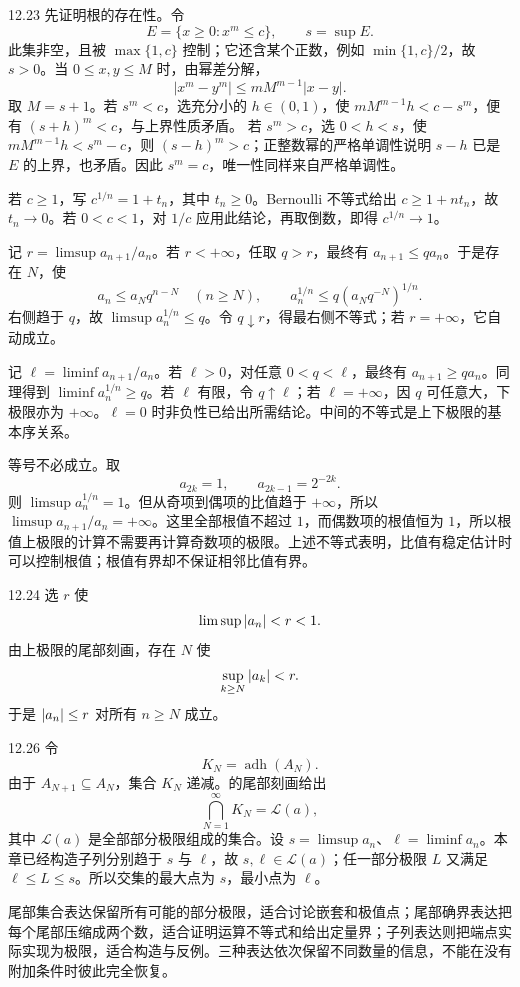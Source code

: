 \begin{solution}{12.23}
先证明根的存在性。令
\[
 E=\{x\ge0:x^m\le c\},\qquad s=\sup E.
\]
此集非空，且被 \(\max\{1,c\}\) 控制；它还含某个正数，例如 \(\min\{1,c\}/2\)，故 \(s>0\)。当 \(0\le x,y\le M\) 时，由幂差分解，
\[
 |x^m-y^m|\le mM^{m-1}|x-y|.
\]
取 \(M=s+1\)。若 \(s^m<c\)，选充分小的 \(h\in(0,1)\)，使
\(mM^{m-1}h<c-s^m\)，便有 \((s+h)^m<c\)，与上界性质矛盾。
若 \(s^m>c\)，选 \(0<h<s\)，使 \(mM^{m-1}h<s^m-c\)，则 \((s-h)^m>c\)；正整数幂的严格单调性说明 \(s-h\) 已是 \(E\) 的上界，也矛盾。因此 \(s^m=c\)，唯一性同样来自严格单调性。

若 \(c\ge1\)，写 \(c^{1/n}=1+t_n\)，其中 \(t_n\ge0\)。Bernoulli 不等式给出 \(c\ge1+nt_n\)，故 \(t_n\to0\)。若 \(0<c<1\)，对 \(1/c\) 应用此结论，再取倒数，即得 \(c^{1/n}\to1\)。

记 \(r=\limsup a_{n+1}/a_n\)。若 \(r<+\infty\)，任取 \(q>r\)，最终有 \(a_{n+1}\le q a_n\)。于是存在 \(N\)，使
\[
 a_n\le a_Nq^{n-N}\quad(n\ge N),\qquad
 a_n^{1/n}\le q(a_Nq^{-N})^{1/n}.
\]
右侧趋于 \(q\)，故 \(\limsup a_n^{1/n}\le q\)。令 \(q\downarrow r\)，得最右侧不等式；若 \(r=+\infty\)，它自动成立。

记 \(\ell=\liminf a_{n+1}/a_n\)。若 \(\ell>0\)，对任意 \(0<q<\ell\)，最终有 \(a_{n+1}\ge q a_n\)。同理得到 \(\liminf a_n^{1/n}\ge q\)。若 \(\ell\) 有限，令 \(q\uparrow\ell\)；若 \(\ell=+\infty\)，因 \(q\) 可任意大，下极限亦为 \(+\infty\)。\(\ell=0\) 时非负性已给出所需结论。中间的不等式是上下极限的基本序关系。

等号不必成立。取
\[
 a_{2k}=1,\qquad a_{2k-1}=2^{-2k}.
\]
则 \(\limsup a_n^{1/n}=1\)。但从奇项到偶项的比值趋于 \(+\infty\)，所以
\(\limsup a_{n+1}/a_n=+\infty\)。这里全部根值不超过 \(1\)，而偶数项的根值恒为 \(1\)，所以根值上极限的计算不需要再计算奇数项的极限。上述不等式表明，比值有稳定估计时可以控制根值；根值有界却不保证相邻比值有界。
\end{solution}

\begin{solution}{12.24}
选 \(r\) 使
\[
 \limsup\left|a_n\right|<r<1.
\]
由上极限的尾部刻画，存在 \(N\) 使
\[
 \sup_{k\ge N}\left|a_k\right|<r.
\]
于是 \(\left|a_n\right|\le r\) 对所有 \(n\ge N\) 成立。
\end{solution}

\begin{solution}{12.26}
令
\[
 K_N=\operatorname{adh}(A_N).
\]
由于 \(A_{N+1}\subseteq A_N\)，集合 \(K_N\) 递减。的尾部刻画给出
\[
 \bigcap_{N=1}^{\infty}K_N=\mathcal L(a),
\]
其中 \(\mathcal L(a)\) 是全部部分极限组成的集合。设
\(s=\limsup a_n\)、\(\ell=\liminf a_n\)。本章已经构造子列分别趋于
\(s\) 与 \(\ell\)，故 \(s,\ell\in\mathcal L(a)\)；任一部分极限
\(L\) 又满足 \(\ell\le L\le s\)。所以交集的最大点为 \(s\)，最小点为
\(\ell\)。

尾部集合表达保留所有可能的部分极限，适合讨论嵌套和极值点；尾部确界表达把每个尾部压缩成两个数，适合证明运算不等式和给出定量界；子列表达则把端点实际实现为极限，适合构造与反例。三种表达依次保留不同数量的信息，不能在没有附加条件时彼此完全恢复。
\end{solution}

